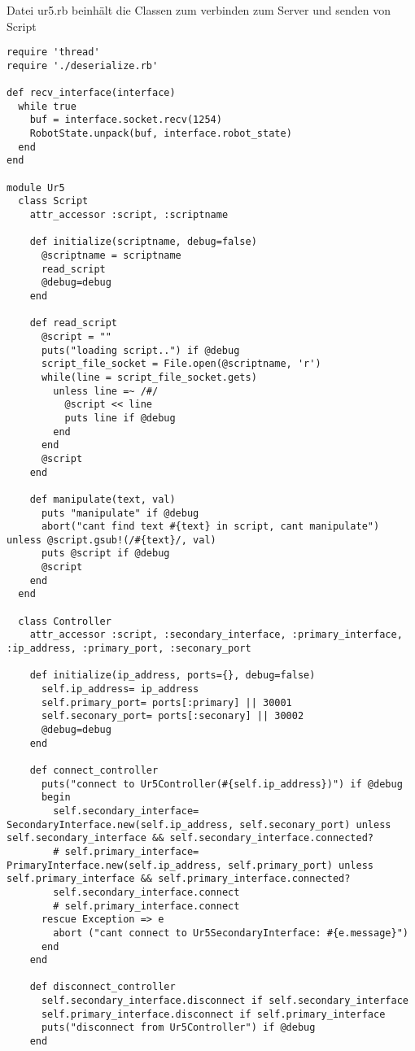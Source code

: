 \documentclass[
a4paper,
12pt,
oneside,
headsepline,		%
footsepline,		%
]{scrbook}
\begin{document}
Datei ur5.rb beinhält die Classen zum verbinden zum Server und senden von Script
\begin{lstlisting}
require 'thread'
require './deserialize.rb'

def recv_interface(interface)
  while true
    buf = interface.socket.recv(1254)
    RobotState.unpack(buf, interface.robot_state)
  end
end

module Ur5
  class Script
    attr_accessor :script, :scriptname

    def initialize(scriptname, debug=false)
      @scriptname = scriptname
      read_script
      @debug=debug
    end

    def read_script
      @script = ""
      puts("loading script..") if @debug
      script_file_socket = File.open(@scriptname, 'r')
      while(line = script_file_socket.gets)
        unless line =~ /#/
          @script << line
          puts line if @debug
        end
      end
      @script
    end

    def manipulate(text, val)
      puts "manipulate" if @debug
      abort("cant find text #{text} in script, cant manipulate") unless @script.gsub!(/#{text}/, val)
      puts @script if @debug
      @script
    end
  end

  class Controller
    attr_accessor :script, :secondary_interface, :primary_interface, :ip_address, :primary_port, :seconary_port

    def initialize(ip_address, ports={}, debug=false)
      self.ip_address= ip_address
      self.primary_port= ports[:primary] || 30001
      self.seconary_port= ports[:seconary] || 30002
      @debug=debug
    end

    def connect_controller
      puts("connect to Ur5Controller(#{self.ip_address})") if @debug
      begin
        self.secondary_interface= SecondaryInterface.new(self.ip_address, self.seconary_port) unless self.secondary_interface && self.secondary_interface.connected?
        # self.primary_interface= PrimaryInterface.new(self.ip_address, self.primary_port) unless self.primary_interface && self.primary_interface.connected?
        self.secondary_interface.connect
        # self.primary_interface.connect
      rescue Exception => e
        abort ("cant connect to Ur5SecondaryInterface: #{e.message}")
      end
    end

    def disconnect_controller
      self.secondary_interface.disconnect if self.secondary_interface
      self.primary_interface.disconnect if self.primary_interface
      puts("disconnect from Ur5Controller") if @debug
    end


\end{lstlisting}
\end{document}
